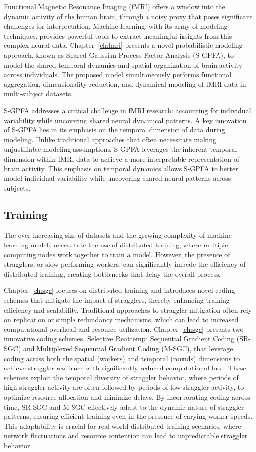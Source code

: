 Functional Magnetic Resonance Imaging (fMRI) offers a window into the dynamic activity of the human brain, through a noisy proxy that poses significant challenges for interpretation. Machine learning, with its array of modeling techniques, provides powerful tools to extract meaningful insights from this complex neural data. Chapter~\ref{ch:fmri} presents a novel probabilistic modeling approach, known as Shared Gaussian Process Factor Analysis (S-GPFA), to model the shared temporal dynamics and spatial organization of brain activity across individuals. The proposed model simultaneously performs functional aggregation, dimensionality reduction, and dynamical modeling of fMRI data in multi-subject datasets. 

S-GPFA addresses a critical challenge in fMRI research: accounting for individual variability while uncovering shared neural dynamical patterns. A key innovation of S-GPFA lies in its emphasis on the temporal dimension of data during modeling. Unlike traditional approaches that often necessitate making unjustifiable modeling assumptions, S-GPFA leverages the inherent temporal dimension within fMRI data to achieve a more interpretable representation of brain activity. This emphasis on temporal dynamics allows S-GPFA to better model individual variability while uncovering shared neural patterns across subjects.



\subsection{Training}
The ever-increasing size of datasets and the growing complexity of machine learning models necessitate the use of distributed training, where multiple computing nodes work together to train a model. However, the presence of stragglers, or slow-performing workers, can significantly impede the efficiency of distributed training, creating bottlenecks that delay the overall process. 

Chapter~\ref{ch:sgc} focuses on distributed training and introduces novel coding schemes that mitigate the impact of stragglers, thereby enhancing training efficiency and scalability.
Traditional approaches to straggler mitigation often rely on replication or simple redundancy mechanisms, which can lead to increased computational overhead and resource utilization. Chapter~\ref{ch:sgc} presents two innovative coding schemes, Selective Reattempt Sequential Gradient Coding (SR-SGC) and Multiplexed Sequential Gradient Coding (M-SGC), that leverage coding across both the spatial (workers) and temporal (rounds) dimensions to achieve straggler resilience with significantly reduced computational load. These schemes exploit the temporal diversity of straggler behavior, where periods of high straggler activity are often followed by periods of low straggler activity, to optimize resource allocation and minimize delays.
By incorporating coding across time, SR-SGC and M-SGC effectively adapt to the dynamic nature of straggler patterns, ensuring efficient training even in the presence of varying worker speeds. This adaptability is crucial for real-world distributed training scenarios, where network fluctuations and resource contention can lead to unpredictable straggler behavior.

